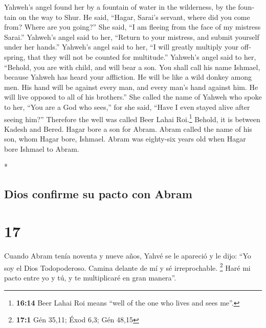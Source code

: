 \begin{paracol}{2}
\begin{otherlanguage}{english}
 Yahweh's angel found her by a fountain of water in the
wilderness, by the fountain on the way to Shur.  He said,
``Hagar, Sarai's servant, where did you come from? Where are you
going?'' She said, ``I am fleeing from the face of my mistress Sarai.''
 Yahweh's angel said to her, ``Return to your mistress,
and submit yourself under her hands.''  Yahweh's angel
said to her, ``I will greatly multiply your offspring, that they will
not be counted for multitude.''  Yahweh's angel said to
her, ``Behold, you are with child, and will bear a son. You shall call
his name Ishmael, because Yahweh has heard your affliction.
 He will be like a wild donkey among men. His hand will
be against every man, and every man's hand against him. He will live
opposed to all of his brothers.''  She called the name of
Yahweh who spoke to her, ``You are a God who sees,'' for she said,
``Have I even stayed alive after seeing him?''  Therefore
the well was called Beer Lahai Roi.\footnote{\textbf{16:14} Beer Lahai
  Roi means ``well of the one who lives and sees me''.} Behold, it is
between Kadesh and Bered.  Hagar bore a son for Abram.
Abram called the name of his son, whom Hagar bore, Ishmael.
 Abram was eighty-six years old when Hagar bore Ishmael
to Abram.

\end{otherlanguage}

\switchcolumn[0]*

\hypertarget{dios-confirme-su-pacto-con-abram}{%
\subsection{Dios confirme su pacto con
Abram}\label{dios-confirme-su-pacto-con-abram}}

\hypertarget{section-32}{%
\section{17}\label{section-32}}

 Cuando Abram tenía noventa y nueve años, Yahvé se le
apareció y le dijo: ``Yo soy el Dios Todopoderoso. Camina delante de mí
y sé irreprochable. \footnote{\textbf{17:1} Gén 35,11; Éxod 6,3; Gén
  48,15}  Haré mi pacto entre yo y tú, y te multiplicaré
en gran manera''.


\end{paracol}
